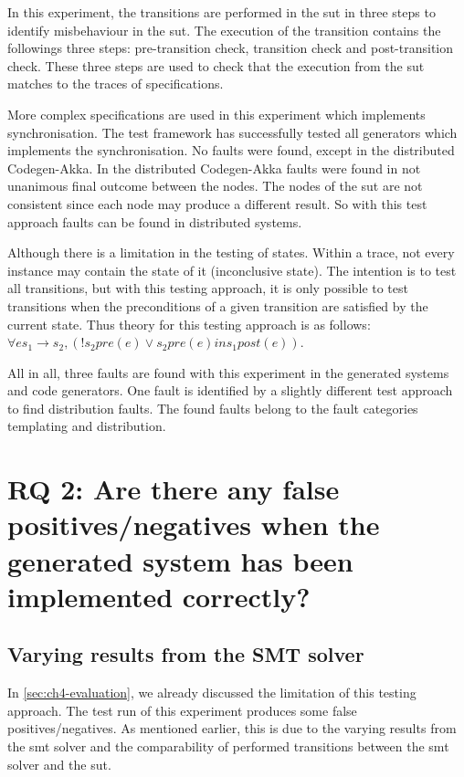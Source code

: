 In this experiment, the transitions are performed in the \gls{sut} in three
steps to identify misbehaviour in the \gls{sut}. The execution of the transition
contains the followings three steps: pre-transition check, transition check and
post-transition check. These three steps are used to check that the execution
from the \gls{sut} matches to the traces of specifications.

More complex specifications are used in this experiment which implements
synchronisation. The test framework has successfully tested all generators which
implements the synchronisation. No faults were found, except in the distributed
Codegen-Akka. In the distributed Codegen-Akka faults were found in not unanimous
final outcome between the nodes. The nodes of the \gls{sut} are not consistent
since each node may produce a different result. So with this test approach
faults can be found in distributed systems.

Although there is a limitation in the testing of states. Within a trace, not
every instance may contain the state of it (inconclusive state).
The intention is to test all transitions,
but with this testing approach, it is only possible to test
transitions when the preconditions of a given transition are satisfied by the
current state. Thus theory for this testing approach is as follows:
$\forall e s_{1} \to s_{2}, (! s_{2} pre(e) \lor s_{2} pre(e) in s_{1} post(e))$.

All in all, three faults are found with this experiment in the generated systems
and code generators. One fault is identified by a slightly different test approach
to find distribution faults. The found faults belong to the fault categories
templating and distribution.

\section{RQ 2: Are there any false positives/negatives when the generated system has been implemented correctly?}

\subsection{Varying results from the SMT solver}
In \autoref{sec:ch4-evaluation}, we already discussed the limitation of this
testing approach. The test run of this experiment produces some false
positives/negatives. As mentioned earlier, this is due to the varying results
from the \gls{smt} solver and the comparability of performed transitions between
the \gls{smt} solver and the \gls{sut}.

